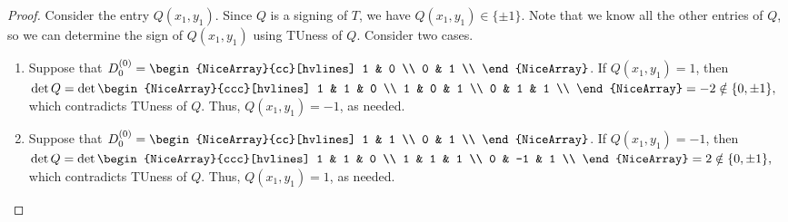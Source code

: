\documentclass{article}
\theoremstyle{definition}
\begin{document}
\begin{proof}
    Consider the entry $Q (x_{1}, y_{1})$. Since $Q$ is a signing of $T$, we have $Q (x_{1}, y_{1}) \in \{\pm 1\}$. Note that we know all the other entries of $Q$, so we can determine the sign of $Q (x_{1}, y_{1})$ using TUness of $Q$. Consider two cases.
    \begin{enumerate}
        \item Suppose that $D_{0}^{(0)} = \begin{NiceArray}{cc}[hvlines] 1 & 0 \\ 0 & 1 \\ \end{NiceArray}$. If $Q (x_{1}, y_{1}) = 1$, then
        $
            \det Q = \det \begin{NiceArray}{ccc}[hvlines]
                1 & 1 & 0 \\
                1 & 0 & 1 \\
                0 & 1 & 1 \\
            \end{NiceArray} = -2 \notin \{0, \pm 1\},
        $
        which contradicts TUness of $Q$. Thus, $Q (x_{1}, y_{1}) = -1$, as needed.
        \item Suppose that $D_{0}^{(0)} = \begin{NiceArray}{cc}[hvlines] 1 & 1 \\ 0 & 1 \\ \end{NiceArray}$. If $Q (x_{1}, y_{1}) = -1$, then
        $
            \det Q = \det \begin{NiceArray}{ccc}[hvlines]
                1 & 1 & 0 \\
                1 & 1 & 1 \\
                0 & -1 & 1 \\
            \end{NiceArray} = 2 \notin \{0, \pm 1\},
        $
        which contradicts TUness of $Q$. Thus, $Q (x_{1}, y_{1}) = 1$, as needed.
    \end{enumerate}
\end{proof}
\end{document}
